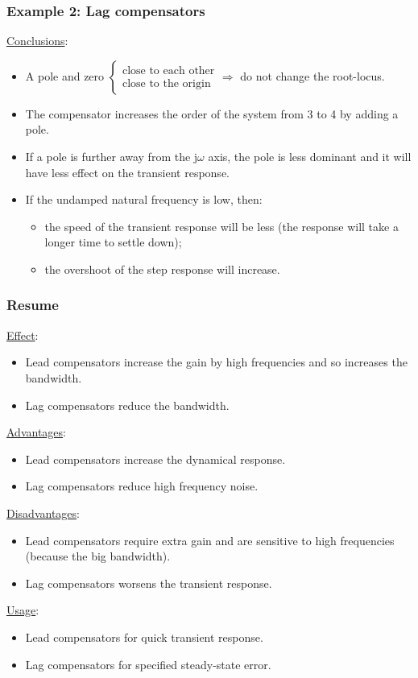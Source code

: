 \begin{frame}
	\frametitle{Example 2: Lag compensators}
	\underline{Conclusions}:
	\begin{itemize}
		\item A pole and zero 
		$\begin{cases} \text{close to each other} \\ \text{close to the origin} \end{cases} \Rightarrow$ do not change the root-locus.
		\item The compensator increases the order of the system from 3 to 4 by adding a pole. 
		\item If a pole is further away from the j$\omega$ axis, the pole is less dominant and it will have less effect on the transient response.
		\item If the undamped natural frequency is low, then:
		\begin{itemize}
			\item the speed of the transient response will be less (the response will take a longer time to settle down);
			\item the overshoot of the step response will increase.
		\end{itemize}
	\end{itemize}
\end{frame}

\begin{frame}
	\frametitle{Resume}
	\underline{Effect}:
	\begin{itemize}
		\item Lead compensators increase the gain by high frequencies and so increases the bandwidth.
		\item Lag compensators reduce the bandwidth.
	\end{itemize}
	\underline{Advantages}:
	\begin{itemize}
		\item Lead compensators increase the dynamical response.
		\item Lag compensators reduce high frequency noise.
	\end{itemize}
	\underline{Disadvantages}:
	\begin{itemize}
		\item Lead compensators require extra gain and are sensitive to high frequencies (because the big bandwidth).
		\item Lag compensators worsens the transient response.  
	\end{itemize}
	\underline{Usage}:
	\begin{itemize}
		\item Lead compensators for quick transient response.
		\item Lag compensators for specified steady-state error.
	\end{itemize}
\end{frame}

